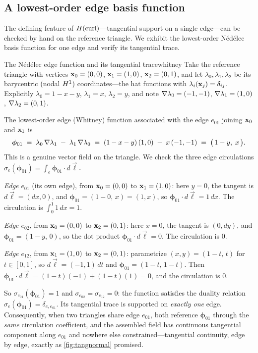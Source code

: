 \subsection{A lowest-order edge basis function}

The defining feature of $H(\mathrm{curl})$---tangential support on a single edge---can be checked by hand on the
reference triangle. We exhibit the lowest-order N\'ed\'elec basis function for one edge and verify its
tangential trace.

\begin{workedexample}{The N\'ed\'elec edge function and its tangential trace}{whitney}
Take the reference triangle with vertices $\mathbf{x}_0=(0,0)$, $\mathbf{x}_1=(1,0)$, $\mathbf{x}_2=(0,1)$, and let
$\lambda_0,\lambda_1,\lambda_2$ be its barycentric (nodal $H^1$) coordinates---the hat functions with
$\lambda_i(\mathbf{x}_j)=\delta_{ij}$. Explicitly $\lambda_0 = 1-x-y$, $\lambda_1 = x$, $\lambda_2 = y$, and
note $\nabla\lambda_0=(-1,-1)$, $\nabla\lambda_1=(1,0)$, $\nabla\lambda_2=(0,1)$.

The lowest-order edge (Whitney) function associated with the edge $e_{01}$ joining $\mathbf{x}_0$ and $\mathbf{x}_1$
is
\[
  \boldsymbol{\phi}_{01} \;=\; \lambda_0\,\nabla\lambda_1 \;-\; \lambda_1\,\nabla\lambda_0
  \;=\; (1-x-y)\,(1,0) \;-\; x\,(-1,-1)
  \;=\; \bigl(\,1-y,\; x\,\bigr).
\]
This is a genuine vector field on the triangle. We check the three edge circulations
$\sigma_e(\boldsymbol{\phi}_{01})=\int_e \boldsymbol{\phi}_{01}\cdot d\vec\ell$.

\smallskip\noindent\emph{Edge $e_{01}$} (its own edge), from $\mathbf{x}_0=(0,0)$ to $\mathbf{x}_1=(1,0)$: here
$y=0$, the tangent is $d\vec\ell=(dx,0)$, and $\boldsymbol{\phi}_{01}=(1-0,\,x)=(1,x)$, so
$\boldsymbol{\phi}_{01}\cdot d\vec\ell = 1\,dx$. The circulation is
$\int_0^1 1\,dx = 1.$

\smallskip\noindent\emph{Edge $e_{02}$}, from $\mathbf{x}_0=(0,0)$ to $\mathbf{x}_2=(0,1)$: here $x=0$, the tangent is
$(0,dy)$, and $\boldsymbol{\phi}_{01}=(1-y,\,0)$, so the dot product
$\boldsymbol{\phi}_{01}\cdot d\vec\ell = 0$. The circulation is $0.$

\smallskip\noindent\emph{Edge $e_{12}$}, from $\mathbf{x}_1=(1,0)$ to $\mathbf{x}_2=(0,1)$: parametrize
$(x,y)=(1-t,\,t)$ for $t\in[0,1]$, so $d\vec\ell=(-1,1)\,dt$ and
$\boldsymbol{\phi}_{01}=(1-t,\,1-t)$. Then
$\boldsymbol{\phi}_{01}\cdot d\vec\ell = (1-t)(-1)+(1-t)(1) = 0$,
and the circulation is $0.$

\smallskip So $\sigma_{e_{01}}(\boldsymbol{\phi}_{01})=1$ and
$\sigma_{e_{02}}=\sigma_{e_{12}}=0$: the function satisfies the duality relation
$\sigma_e(\boldsymbol{\phi}_{01})=\delta_{e,e_{01}}$. Its tangential trace is supported on \emph{exactly
one} edge. Consequently, when two triangles share edge $e_{01}$, both reference $\boldsymbol{\phi}_{01}$
through the \emph{same} circulation coefficient, and the assembled field has continuous tangential
component along $e_{01}$ and nowhere else constrained---tangential continuity, edge by edge, exactly as
\cref{fig:tangnormal} promised.
\end{workedexample}

